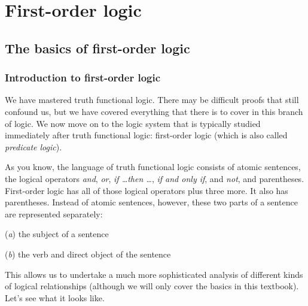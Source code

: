 \graphicspath{{figures--proofs/}}
\part{First-order logic}
\label{ch.FOL}

\chapter{The basics of first-order logic}\label{FOL-basics}

\section{Introduction to first-order logic}

We have mastered truth functional logic. There may be difficult proofs that still confound us, but we have covered everything that there is to cover in this branch of logic. We now move on to the logic system that is typically studied immediately after truth functional logic: first-order logic (which is also called \textit{predicate logic}). 

As you know, the language of truth functional logic consists of atomic sentences, the logical operators \textit{and}, \textit{or}, \textit{if \ldots then \ldots}, \textit{if and only if}, and \textit{not}, and parentheses. First-order logic has all of those logical operators plus three more. It also has parentheses. Instead of atomic sentences, however, these two parts of a sentence are represented separately: 
\begin{ebullet}
\item[(\textit{a})] the subject of a sentence
\item[(\textit{b})] the verb and direct object of the sentence
\end{ebullet}
This allows us to undertake a much more sophisticated analysis of different kinds of logical relationships (although we will only cover the basics in this textbook). Let's see what it looks like.


